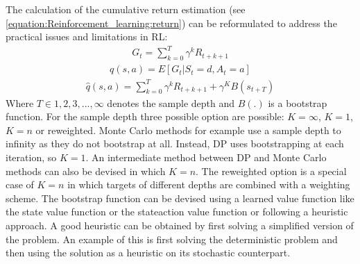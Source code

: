 \documentclass[letterpaper,10pt,english]{jupyterBook}
\begin{document}
\sphinxAtStartPar
The calculation of the cumulative return estimation (see \eqref{equation:Reinforcement_learning:return}) can be reformulated to address the practical issues and limitations in RL:
\begin{equation*}
\begin{split} G_t = \sum_{k=0}^T\gamma^kR_{t+k+1} \end{split}
\end{equation*}\begin{equation*}
\begin{split} q(s,a) = E[G_t| S_t = d, A_t = a]\end{split}
\end{equation*}\begin{equation*}
\begin{split} \hat{q}(s,a) = \sum_{k=0}^T \gamma^kR_{t+k+1} + \gamma^KB(s_{t+T}) \end{split}
\end{equation*}
\sphinxAtStartPar
Where \(T \in {1,2,3, ..., \infty}\) denotes the sample depth and \(B(.)\) is a bootstrap function. For the sample depth three possible option are possible: \(K = \infty\), \(K = 1\),  \(K = n\) or reweighted. Monte Carlo methods for example use a sample depth to infinity as they do not bootstrap at all. Instead, DP uses bootstrapping at each iteration, so \(K = 1\). An intermediate method between DP and Monte Carlo methods can also be devised in which \( K = n\). The reweighted option is a special case of \( K = n\) in which targets of different depths are combined with a weighting scheme. The bootstrap function can be devised using a learned value function like the state value function or the state\sphinxhyphen{}action value function or following a heuristic approach. A good heuristic can be obtained by first solving a simplified version of the problem. An example of this is first solving the deterministic problem and then using the solution as a heuristic on its stochastic counterpart.
\end{document}
